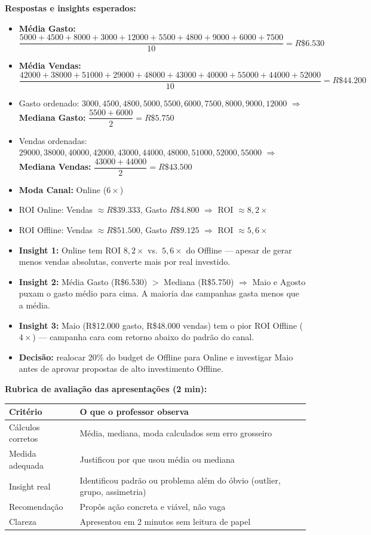 \begin{BoardBox}
\smallskip
\textbf{Respostas e insights esperados:}
\begin{itemize}
  \item \textbf{Média Gasto:} $\dfrac{5000+4500+8000+3000+12000+5500+4800+9000+6000+7500}{10} = R\$6.530$
  \item \textbf{Média Vendas:} $\dfrac{42000+38000+51000+29000+48000+43000+40000+55000+44000+52000}{10} = R\$44.200$
  \item Gasto ordenado: $3000, 4500, 4800, 5000, 5500, 6000, 7500, 8000, 9000, 12000$
    $\Rightarrow$ \textbf{Mediana Gasto:} $\dfrac{5500+6000}{2} = R\$5.750$
  \item Vendas ordenadas: $29000, 38000, 40000, 42000, 43000, 44000, 48000, 51000, 52000, 55000$
    $\Rightarrow$ \textbf{Mediana Vendas:} $\dfrac{43000+44000}{2} = R\$43.500$
  \item \textbf{Moda Canal:} Online ($6\times$)
  \item ROI Online: Vendas $\approx R\$39.333$, Gasto $R\$4.800$ $\Rightarrow$ ROI $\approx 8{,}2\times$
  \item ROI Offline: Vendas $\approx R\$51.500$, Gasto $R\$9.125$ $\Rightarrow$ ROI $\approx 5{,}6\times$
  \item \textbf{Insight 1:} Online tem ROI $8{,}2\times$ vs.\ $5{,}6\times$ do Offline —
  apesar de gerar menos vendas absolutas, converte mais por real investido.
  \item \textbf{Insight 2:} Média Gasto (R\$6.530) $>$ Mediana (R\$5.750) $\Rightarrow$
  Maio e Agosto puxam o gasto médio para cima. A maioria das campanhas gasta menos que a média.
  \item \textbf{Insight 3:} Maio (R\$12.000 gasto, R\$48.000 vendas) tem o pior
  ROI Offline ($4\times$) — campanha cara com retorno abaixo do padrão do canal.
  \item \textbf{Decisão:} realocar 20\% do budget de Offline para Online e
  investigar Maio antes de aprovar propostas de alto investimento Offline.
\end{itemize}
\end{BoardBox}

\begin{SolvedBox}
\textbf{Rubrica de avaliação das apresentações (2 min):}
\begin{tabular}{|p{3.5cm}|p{9.5cm}|}
\hline
\textbf{Critério} & \textbf{O que o professor observa} \\
\hline
Cálculos corretos & Média, mediana, moda calculados sem erro grosseiro \\
Medida adequada   & Justificou por que usou média ou mediana \\
Insight real      & Identificou padrão ou problema além do óbvio (outlier, grupo, assimetria) \\
Recomendação      & Propôs ação concreta e viável, não vaga \\
Clareza           & Apresentou em 2 minutos sem leitura de papel \\
\hline
\end{tabular}
\end{SolvedBox}

